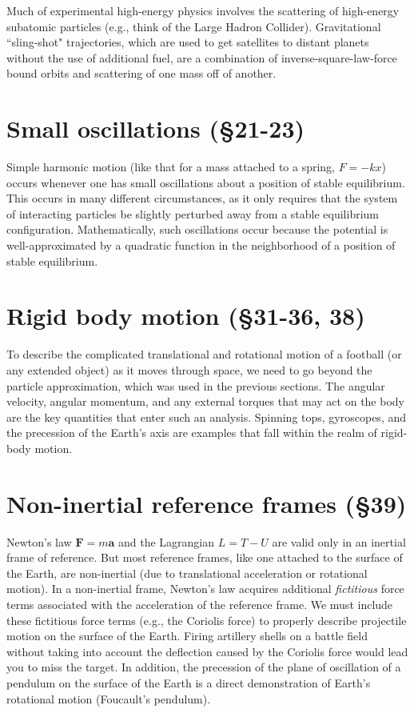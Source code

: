 \documentclass[10pt]{article}
\numberwithin{equation}{section}
\renewcommand{\vec}[1]{\mathbf{#1}}
\begin{document}
Much of experimental high-energy physics involves the 
scattering of high-energy subatomic particles (e.g., 
think of the Large Hadron Collider).
Gravitational ``sling-shot" trajectories, which are 
used to get satellites to distant planets without the use of 
additional fuel, are a combination of inverse-square-law-force
bound orbits and scattering of one mass off of another.
 
\section{Small oscillations (\S21-23)}

Simple harmonic motion (like that for a mass attached to 
a spring, $F=-kx$) occurs whenever one has small oscillations 
about a position of stable equilibrium.
This occurs in many different circumstances, as it 
only requires that the system of interacting 
particles be slightly perturbed away from a stable 
equilibrium configuration.
Mathematically, such oscillations occur because
the potential is well-approximated by a quadratic 
function in the neighborhood of a position of stable 
equilibrium.

\section{Rigid body motion (\S31-36, 38)}

To describe the complicated translational and rotational 
motion of a football (or any extended object) as 
it moves through space, we need to go beyond the 
particle approximation, which was used in the previous sections.
The angular velocity, angular momentum, and any external
torques that may act on the body are the key quantities that 
enter such an analysis.
Spinning tops, gyroscopes, and the precession of the 
Earth's axis are examples that fall within the realm of 
rigid-body motion.

\section{Non-inertial reference frames (\S39)}

Newton's law $\vec F=m \vec a$ and the Lagrangian
$L=T-U$ are valid only in an inertial frame of 
reference.
But most reference frames, like one attached to
the surface of the Earth, are non-inertial 
(due to translational acceleration or rotational motion).
In a non-inertial frame, Newton's law acquires additional
{\em fictitious} force terms associated with the 
acceleration of the reference frame.
We must include these fictitious force terms (e.g.,
the Coriolis force) to properly describe projectile motion
on the surface of the Earth.
Firing artillery shells on a battle field without taking
into account the deflection caused by the Coriolis force
would lead you to miss the target.
In addition, the precession of the plane of oscillation of 
a pendulum on the surface of the Earth is a direct demonstration 
of Earth's rotational motion (Foucault's pendulum).
\end{document}
